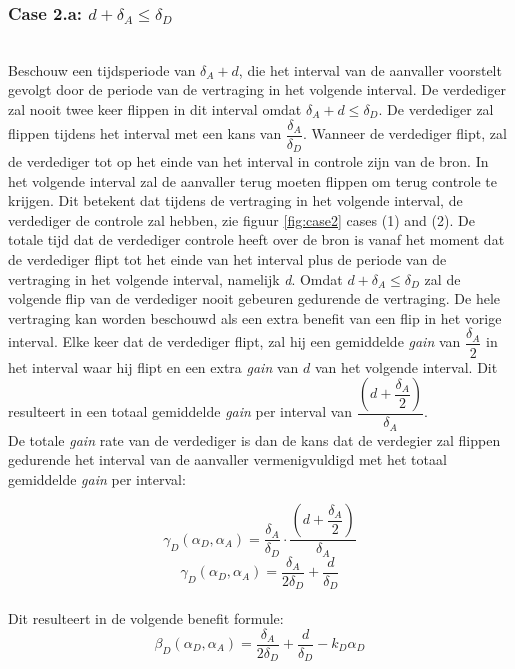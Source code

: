 \documentclass[master=cws, masteroption=vs,english]{kulemt}
\begin{document}
\begin{abstract*}
\subsubsection*{\textbf{Case 2.a:} $d + \delta_{A} \leq \delta_{D}$}
~~\\
Beschouw een tijdsperiode van $\delta_{A} + d$, die het interval van de aanvaller voorstelt gevolgt door de periode van de vertraging in het volgende interval. De verdediger zal nooit twee keer flippen in dit interval omdat  $\delta_{A} + d \leq \delta_{D}$. De verdediger zal flippen tijdens het interval met een kans van $\dfrac{\delta_{A}}{\delta_{D}} $. Wanneer de verdediger flipt, zal de verdediger tot op het einde van het interval in controle zijn van de bron. In het volgende interval zal de aanvaller terug moeten flippen om terug controle te krijgen. Dit betekent dat tijdens de vertraging in het volgende interval, de verdediger de controle zal hebben, zie figuur  \ref{fig:case2} cases (1) and (2). De totale tijd dat de verdediger controle heeft over de bron is vanaf het moment dat de verdediger flipt tot het einde van het interval plus de periode van de vertraging in het volgende interval, namelijk \textit{d}. Omdat $d + \delta_{A} \leq \delta_{D}$  zal de volgende flip van de verdediger nooit gebeuren gedurende de vertraging. De hele vertraging kan worden beschouwd als een extra benefit van een flip in het vorige interval.
Elke keer dat de verdediger flipt, zal hij een gemiddelde \textit{gain} van $\dfrac{\delta_{A}}{2}$ in het interval waar hij flipt en een extra \textit{gain} van $d$ van het volgende interval. Dit resulteert in een totaal gemiddelde \textit{gain} per interval van
$\dfrac{(d+\dfrac{\delta_{A}}{2})}{\delta_{A}}$. \\

De totale \textit{gain} rate van de verdediger is dan de kans dat de verdegier zal flippen gedurende het interval van de aanvaller vermenigvuldigd met het totaal gemiddelde \textit{gain} per interval:


\begin{equation}\label{first}
\gamma_{D}(\alpha_{D},\alpha_{A}) = \dfrac{\delta_{A}}{\delta_{D}} \cdot \dfrac{(d+\dfrac{\delta_{A}}{2})}{\delta_{A}} 
\end{equation}
\begin{equation}\label{first}
\gamma_{D}(\alpha_{D},\alpha_{A}) = \dfrac{\delta_{A}}{2\delta_{D}} + \dfrac{d}{\delta_{D}} 
\end{equation}\\
Dit resulteert in de volgende benefit formule:
\begin{equation}\label{first}
\beta_{D}(\alpha_{D},\alpha_{A}) = \dfrac{\delta_{A}}{2\delta_{D}} + \dfrac{d}{\delta_{D}} - k_{D} \alpha_{D} 
\end{equation}\\


\end{abstract*}
\end{document}
